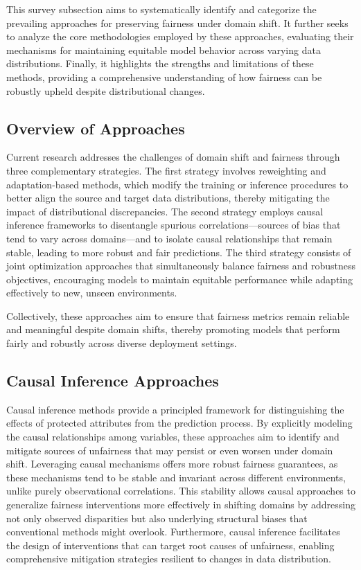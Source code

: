 \documentclass[sigconf]{acmart}
\begin{document}
This survey subsection aims to systematically identify and categorize the prevailing approaches for preserving fairness under domain shift. It further seeks to analyze the core methodologies employed by these approaches, evaluating their mechanisms for maintaining equitable model behavior across varying data distributions. Finally, it highlights the strengths and limitations of these methods, providing a comprehensive understanding of how fairness can be robustly upheld despite distributional changes.

\subsection{Overview of Approaches}

Current research addresses the challenges of domain shift and fairness through three complementary strategies. The first strategy involves reweighting and adaptation-based methods, which modify the training or inference procedures to better align the source and target data distributions, thereby mitigating the impact of distributional discrepancies. The second strategy employs causal inference frameworks to disentangle spurious correlations—sources of bias that tend to vary across domains—and to isolate causal relationships that remain stable, leading to more robust and fair predictions. The third strategy consists of joint optimization approaches that simultaneously balance fairness and robustness objectives, encouraging models to maintain equitable performance while adapting effectively to new, unseen environments.

Collectively, these approaches aim to ensure that fairness metrics remain reliable and meaningful despite domain shifts, thereby promoting models that perform fairly and robustly across diverse deployment settings.

\subsection{Causal Inference Approaches}
Causal inference methods provide a principled framework for distinguishing the effects of protected attributes from the prediction process. By explicitly modeling the causal relationships among variables, these approaches aim to identify and mitigate sources of unfairness that may persist or even worsen under domain shift. Leveraging causal mechanisms offers more robust fairness guarantees, as these mechanisms tend to be stable and invariant across different environments, unlike purely observational correlations. This stability allows causal approaches to generalize fairness interventions more effectively in shifting domains by addressing not only observed disparities but also underlying structural biases that conventional methods might overlook. Furthermore, causal inference facilitates the design of interventions that can target root causes of unfairness, enabling comprehensive mitigation strategies resilient to changes in data distribution.
\end{document}
